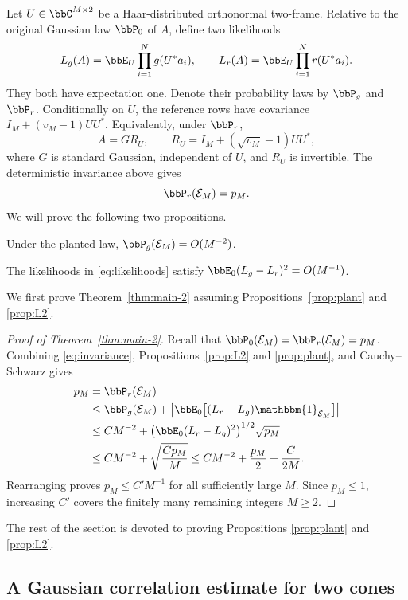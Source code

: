 \documentclass[11pt,reqno]{amsart}
\begin{document}
Let $U\in\bbC^{M\times2}$ be a Haar-distributed orthonormal two-frame. Relative to the original Gaussian law $\bbP_0$ of $A$, define two likelihoods
\begin{equation}\label{eq:likelihoods}
 L_g(A)=\bbE_U\prod_{i=1}^N g(U^*a_i),\qquad
 L_r(A)=\bbE_U\prod_{i=1}^N r(U^*a_i).
\end{equation}
They both have expectation one. Denote their probability laws by $\bbP_g$ and $\bbP_r$. Conditionally on $U$, the reference rows have covariance $I_M+(v_M-1)UU^*$. Equivalently, under $\bbP_r$,
\[
 A=G R_U,\qquad R_U=I_M+(\sqrt{v_M}-1)UU^*,
\]
where $G$ is standard Gaussian, independent of $U$, and $R_U$ is invertible. The deterministic invariance above gives
\begin{equation}\label{eq:invariance}
 \bbP_r(\mathcal E_M)=p_M.
\end{equation}
We will prove the following two propositions.
\begin{ppn}\label{prop:plant}
Under the planted law, $\bbP_g(\mathcal E_M)=O(M^{-2})$.
\end{ppn}
\begin{ppn}\label{prop:L2}
The likelihoods in \eqref{eq:likelihoods} satisfy $\bbE_0(L_g-L_r)^2=O(M^{-1})$.
\end{ppn}
We first prove Theorem~\ref{thm:main-2} assuming Propositions~\ref{prop:plant} and \ref{prop:L2}.
\begin{proof}[Proof of Theorem~\ref{thm:main-2}]
Recall that $\bbP_0(\mathcal E_M)=\bbP_r(\mathcal E_M)=p_M$. Combining \eqref{eq:invariance}, Propositions~\ref{prop:L2} and \ref{prop:plant}, and Cauchy--Schwarz gives
\begin{align*}
 p_M
 &=\bbP_r(\mathcal E_M)\\
 &\le\bbP_g(\mathcal E_M)+\left|\bbE_0\bigl[(L_r-L_g)\mathbbm{1}_{\mathcal E_M}\bigr]\right|\\
 &\le C M^{-2}+\bigl(\bbE_0(L_r-L_g)^2\bigr)^{1/2}\sqrt{p_M}\\
 &\le C M^{-2}+\sqrt{\frac{C p_M}{M}}
 \le C M^{-2}+\frac{p_M}{2}+\frac{C}{2M}.
\end{align*}
Rearranging proves $p_M\le C'M^{-1}$ for all sufficiently large $M$. Since $p_M\le1$, increasing $C'$ covers the finitely many remaining integers $M\ge2$.
\end{proof}
The rest of the section is devoted to proving Propositions \ref{prop:plant} and \ref{prop:L2}.

\subsection{A Gaussian correlation estimate for two cones}
\end{document}
